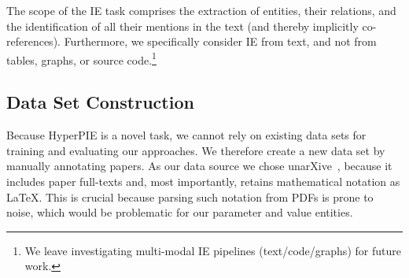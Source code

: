 


The scope of the IE task comprises the extraction of entities, their relations, and the identification of all their mentions in the text (and thereby implicitly co-references). %
Furthermore, we specifically consider IE from text, and not from tables, graphs, or source code.\footnote{We leave investigating multi-modal IE pipelines (text/code/graphs) for future work.}

\subsection{Data Set Construction}\label{sec:data-set-contruction}





Because HyperPIE is a novel task, we cannot rely on existing data sets for training and evaluating our approaches. We therefore create a new data set by manually annotating papers. As our data source we chose unarXive~\cite{Saier2023unarXive}, because it includes paper full-texts and, most importantly, retains mathematical notation as \LaTeX{}. This is crucial because parsing such notation from PDFs is prone to noise, which would be problematic for our parameter and value entities.  %

